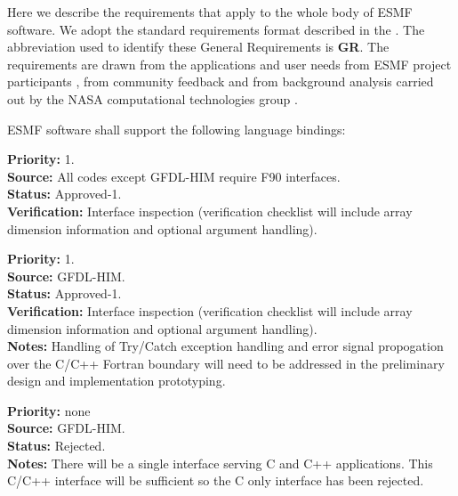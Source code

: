 
Here we describe the requirements that apply to the whole body of 
ESMF software.  We adopt the standard requirements format described in 
the .  The abbreviation used to identify
these General Requirements is {\bf GR}. The requirements
are drawn from the applications and user needs from ESMF project 
participants \cite{ESMFWEBSITE}, from community feedback and from background analysis carried out by the NASA
computational technologies group \cite{WOM2002}.


ESMF software shall support the following language bindings:

\begin{reqlist}
{\bf Priority:} 1. \\
{\bf Source:} All codes except GFDL-HIM require F90 interfaces. \\
{\bf Status:} Approved-1. \\
{\bf Verification:} Interface inspection (verification
  checklist will include array dimension information and 
  optional argument handling).
\end{reqlist}

\begin{reqlist}
{\bf Priority:} 1. \\
{\bf Source:} GFDL-HIM. \\
{\bf Status:} Approved-1. \\
{\bf Verification:} Interface inspection (verification
  checklist will include array dimension information and 
  optional argument handling).\\
{\bf Notes:} Handling of Try/Catch exception handling and 
error signal propogation over the C/C++ Fortran boundary 
will need to be addressed in the preliminary design and
implementation prototyping.
\end{reqlist}

\begin{reqlist}
  {\bf Priority:} none \\
  {\bf Source:} GFDL-HIM. \\
  {\bf Status:} Rejected. \\
  {\bf Notes:} There will be a single interface serving C and C++
  applications. This C/C++ interface will be sufficient so the C only
  interface has been rejected.
\end{reqlist}

